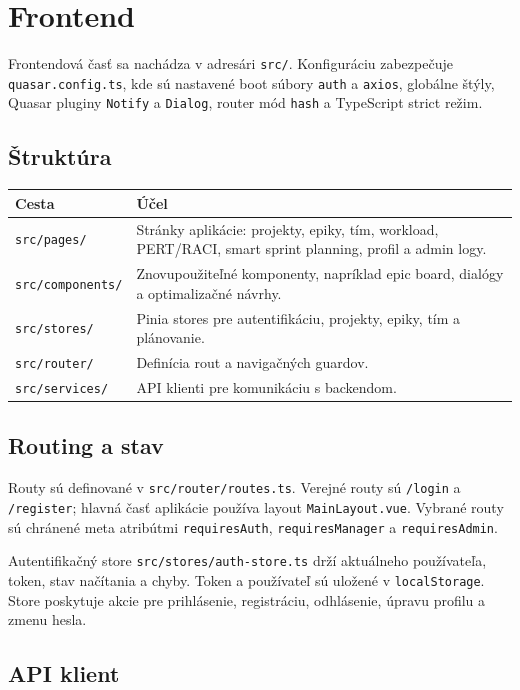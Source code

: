 ﻿\documentclass[12pt,a4paper]{article}
\begin{document}
\section{Frontend}

Frontendová časť sa nachádza v adresári \texttt{src/}. Konfiguráciu zabezpečuje \texttt{quasar.config.ts}, kde sú nastavené boot súbory \texttt{auth} a \texttt{axios}, globálne štýly, Quasar pluginy \texttt{Notify} a \texttt{Dialog}, router mód \texttt{hash} a TypeScript strict režim.

\subsection{Štruktúra}

\begin{longtable}{|p{4.5cm}|p{9cm}|}
\hline
\textbf{Cesta} & \textbf{Účel} \\
\hline
\texttt{src/pages/} & Stránky aplikácie: projekty, epiky, tím, workload, PERT/RACI, smart sprint planning, profil a admin logy. \\
\hline
\texttt{src/components/} & Znovupoužiteľné komponenty, napríklad epic board, dialógy a optimalizačné návrhy. \\
\hline
\texttt{src/stores/} & Pinia stores pre autentifikáciu, projekty, epiky, tím a plánovanie. \\
\hline
\texttt{src/router/} & Definícia rout a navigačných guardov. \\
\hline
\texttt{src/services/} & API klienti pre komunikáciu s backendom. \\
\hline
\end{longtable}

\subsection{Routing a stav}

Routy sú definované v \texttt{src/router/routes.ts}. Verejné routy sú \texttt{/login} a \texttt{/register}; hlavná časť aplikácie používa layout \texttt{MainLayout.vue}. Vybrané routy sú chránené meta atribútmi \texttt{requiresAuth}, \texttt{requiresManager} a \texttt{requiresAdmin}.

Autentifikačný store \texttt{src/stores/auth-store.ts} drží aktuálneho používateľa, token, stav načítania a chyby. Token a používateľ sú uložené v \texttt{localStorage}. Store poskytuje akcie pre prihlásenie, registráciu, odhlásenie, úpravu profilu a zmenu hesla.

\subsection{API klient}
\end{document}
